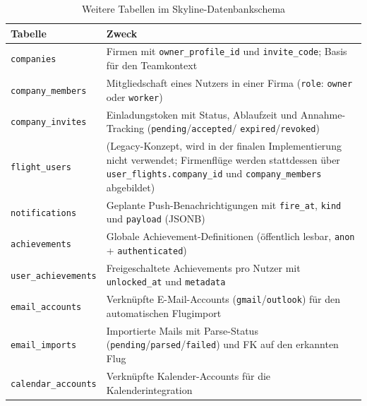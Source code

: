 \begin{table}[H]
  \centering
  \caption{Weitere Tabellen im Skyline-Datenbankschema}
  \label{tab:weitere_tabellen}
  \begin{tabularx}{\textwidth}{l X}
    \toprule
    \textbf{Tabelle} & \textbf{Zweck} \\
    \midrule
    \texttt{companies}        & Firmen mit \texttt{owner\_profile\_id} und
                                \texttt{invite\_code}; Basis für den Teamkontext \\
    \texttt{company\_members} & Mitgliedschaft eines Nutzers in einer Firma
                                (\texttt{role}: \texttt{owner} oder \texttt{worker}) \\
    \texttt{company\_invites} & Einladungstoken mit Status, Ablaufzeit und
                                Annahme-Tracking (\texttt{pending}/\texttt{accepted}/
                                \texttt{expired}/\texttt{revoked}) \\
    \texttt{flight\_users}    & (Legacy-Konzept, wird in der finalen Implementierung
                                nicht verwendet; Firmenflüge werden stattdessen über
                                \texttt{user\_flights.company\_id} und
                                \texttt{company\_members} abgebildet) \\
    \texttt{notifications}    & Geplante Push-Benachrichtigungen mit
                                \texttt{fire\_at}, \texttt{kind} und \texttt{payload} (JSONB) \\
    \texttt{achievements}     & Globale Achievement-Definitionen (öffentlich lesbar,
                                \texttt{anon} + \texttt{authenticated}) \\
    \texttt{user\_achievements}& Freigeschaltete Achievements pro Nutzer mit
                                 \texttt{unlocked\_at} und \texttt{metadata} \\
    \texttt{email\_accounts}  & Verknüpfte E-Mail-Accounts (\texttt{gmail}/\texttt{outlook})
                                für den automatischen Flugimport \\
    \texttt{email\_imports}   & Importierte Mails mit Parse-Status
                                (\texttt{pending}/\texttt{parsed}/\texttt{failed})
                                und FK auf den erkannten Flug \\
    \texttt{calendar\_accounts}& Verknüpfte Kalender-Accounts für die
                                 Kalenderintegration \\
    \bottomrule
  \end{tabularx}
\end{table}

